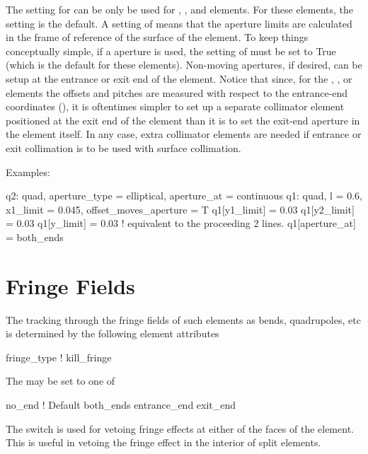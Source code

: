 The  setting for  can be only be used for
, , and  elements.  For
these elements, the  setting is the default.  A setting of
 means that the aperture limits are calculated in the
frame of reference of the surface of the element. To keep things
conceptually simple, if a  aperture is used, the setting
of  must be set to True (which is the
default for these elements). Non-moving apertures, if desired, can be
setup at the entrance or exit end of the element. Notice that since,
for the , , or  elements
the offsets and pitches are measured with respect to the entrance-end
coordinates (), it is oftentimes simpler to set up a
separate collimator element positioned at the exit end of the element
than it is to set the exit-end aperture in the element itself. In any
case, extra collimator elements are needed if entrance or exit
collimation is to be used with surface collimation.

Examples:
\begin{example}
  q2: quad, aperture_type = elliptical, aperture_at = continuous
  q1: quad, l = 0.6, x1_limit = 0.045, offset_moves_aperture = T
  q1[y1_limit] = 0.03
  q1[y2_limit] = 0.03
  q1[y_limit] = 0.03  ! equivalent to the proceeding 2 lines.  
  q1[aperture_at] = both_ends
\end{example}

\section{Fringe Fields}
\label{s:fringe}

The tracking through the fringe fields of such elements as bends,
quadrupoles, etc is determined by the following element attributes
\begin{example}
  fringe_type    !  
  kill_fringe
\end{example}

The  may be set to one of
\begin{example}
  no_end               ! Default
  both_ends
  entrance_end
  exit_end
\end{example}
The  switch is used for vetoing fringe effects at
either of the faces of the element. This is useful in vetoing the
fringe effect in the interior of split elements.

